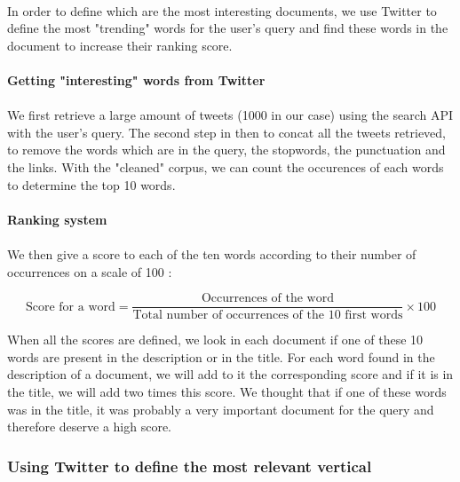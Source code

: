 \documentclass[10pt, a4paper]{article}
\begin{document}
\paragraph{}In order to define which are the most interesting documents, we use Twitter to define the most "trending" words for the user's query and find these words in the document to increase their ranking score.

\paragraph{Getting "interesting" words from Twitter}
\paragraph{}We first retrieve a large amount of tweets (1000 in our case) using the search API with the user's query. The second step in then to concat all the tweets retrieved, to remove the words which are in the query, the stopwords, the punctuation and the links. With the "cleaned" corpus, we can count the occurences of each words to determine the top 10 words.

\paragraph{Ranking system}
\paragraph{}We then give a score to each of the ten words according to their number of occurrences on a scale of 100 :

\[ \textrm{Score for a word} = \frac{\textrm{Occurrences of the word}}{\textrm{Total number of occurrences of the 10 first words}} \times 100 \]

When all the scores are defined, we look in each document if one of these 10 words are present in the description or in the title. For each word found in the description of a document, we will add to it the corresponding score and if it is in the title, we will add two times this score. We thought that if one of these words was in the title, it was probably a very important document for the query and therefore deserve a high score.



\subsubsection{Using Twitter to define the most relevant vertical}
\end{document}
